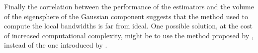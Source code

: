 Finally the correlation between the performance of the estimators and the volume of the eigensphere of the Gaussian component suggests that the method used to compute the local bandwidths is far from ideal.
One possible solution, at the cost of increased computational complexity, might be to use the method proposed by \citeauthor{breiman1977variable}, instead of the one introduced by \citeauthor{ferdosi2011comparison}.